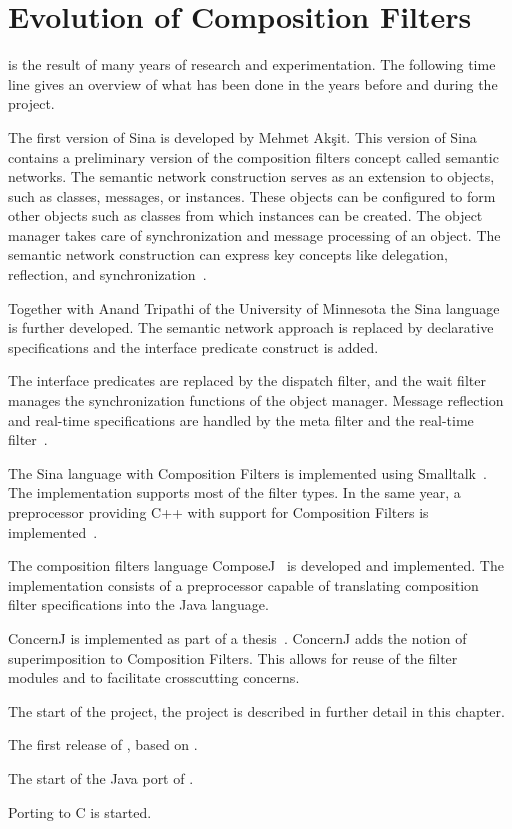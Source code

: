 \section{Evolution of Composition Filters}
\Compose* is the result of many years of research and experimentation.
The following time line gives an overview of what has been done in the years before and during the \Compose* project.

\begin{description}[noitemsep,style=sameline,leftmargin=15mm]
\item[1985] The first version of Sina is developed by Mehmet Ak\c{s}it.
            This version of Sina contains a preliminary version of the composition filters concept called semantic networks.
            The semantic network construction serves as an extension to objects, such as classes, messages, or instances.
            These objects can be configured to form other objects such as classes from which instances can be created.
            The object manager takes care of synchronization and message processing of an object.
            The semantic network construction can express key concepts like delegation, reflection, and synchronization~\cite{koopmans:sina95}.
\item[1987] Together with Anand Tripathi of the University of Minnesota the Sina language is further developed.
            The semantic network approach is replaced by declarative specifications and the interface predicate construct is added.
\item[1991] The interface predicates are replaced by the dispatch filter, and the wait filter manages the synchronization functions of the object manager.
            Message reflection and real-time specifications are handled by the meta filter and the real-time filter~\cite{bergmans:phd94}.
\item[1995] The Sina language with Composition Filters is implemented using Smalltalk~\cite{koopmans:sina95}.
            The implementation supports most of the filter types.
            In the same year, a preprocessor providing C++ with support for Composition Filters is implemented~\cite{glandrup:ms95}.
\item[1999] The composition filters language ComposeJ~\cite{wichman:ms99} is developed and implemented.
            The implementation consists of a preprocessor capable of translating composition filter specifications into the Java language.
\item[2001] ConcernJ is implemented as part of a \MSc thesis~\cite{salinas:ms01}.
            ConcernJ adds the notion of superimposition to Composition Filters.
            This allows for reuse of the filter modules and to facilitate crosscutting concerns.
\item[2003] The start of the \Compose* project, the project is described in further detail in this chapter.
\item[2004] The first release of \Compose*, based on \dotNET.
\item[2005] The start of the Java port of \Compose*.
\item[2006] Porting \Compose* to C is started.
\end{description}